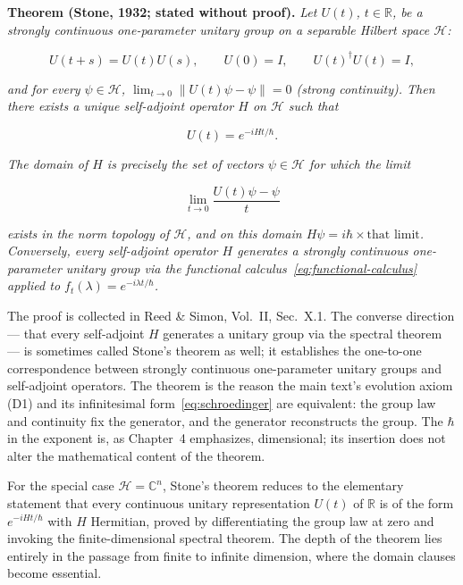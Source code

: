 \medskip\noindent\textbf{Theorem (Stone, 1932; stated without proof).} \emph{Let $U(t)$, $t \in \mathbb{R}$, be a strongly continuous one-parameter unitary group on a separable Hilbert space $\mathcal{H}$:}
\begin{linenomath}
    \begin{equation}
        U(t+s) = U(t)U(s), \qquad U(0) = I, \qquad U(t)^\dagger U(t) = I,
        \label{eq:stone-hypotheses}
    \end{equation}
\end{linenomath}
\emph{and for every $\psi \in \mathcal{H}$, $\lim_{t \to 0} \|U(t)\psi - \psi\| = 0$ (strong continuity). Then there exists a unique self-adjoint operator $H$ on $\mathcal{H}$ such that}
\begin{linenomath}
    \begin{equation}
        U(t) = e^{-iHt/\hbar}.
        \label{eq:stone-conclusion}
    \end{equation}
\end{linenomath}
\emph{The domain of $H$ is precisely the set of vectors $\psi \in \mathcal{H}$ for which the limit}
\begin{linenomath}
    \begin{equation}
        \lim_{t \to 0} \frac{U(t)\psi - \psi}{t}
        \label{eq:stone-domain}
    \end{equation}
\end{linenomath}
\emph{exists in the norm topology of $\mathcal{H}$, and on this domain $H\psi = i\hbar \times \text{that limit}$. Conversely, every self-adjoint operator $H$ generates a strongly continuous one-parameter unitary group via the functional calculus~\eqref{eq:functional-calculus} applied to $f_t(\lambda) = e^{-i\lambda t/\hbar}$.}

The proof is collected in Reed \& Simon, Vol.~II, Sec.~X.1. The converse direction --- that every self-adjoint $H$ generates a unitary group via the spectral theorem --- is sometimes called Stone's theorem as well; it establishes the one-to-one correspondence between strongly continuous one-parameter unitary groups and self-adjoint operators. The theorem is the reason the main text's evolution axiom (D1) and its infinitesimal form~\eqref{eq:schroedinger} are equivalent: the group law and continuity fix the generator, and the generator reconstructs the group. The $\hbar$ in the exponent is, as Chapter~4 emphasizes, dimensional; its insertion does not alter the mathematical content of the theorem.

For the special case $\mathcal{H} = \mathbb{C}^n$, Stone's theorem reduces to the elementary statement that every continuous unitary representation $U(t)$ of $\mathbb{R}$ is of the form $e^{-iHt/\hbar}$ with $H$ Hermitian, proved by differentiating the group law at zero and invoking the finite-dimensional spectral theorem. The depth of the theorem lies entirely in the passage from finite to infinite dimension, where the domain clauses become essential.

